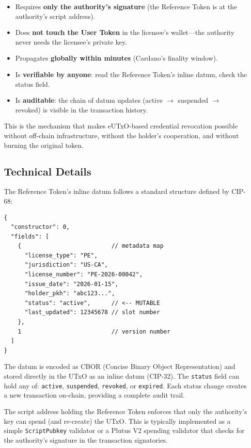 \begin{itemize}[nosep]
  \item Requires \textbf{only the authority's signature} (the Reference Token
    is at the authority's script address).
  \item Does \textbf{not touch the User Token} in the licensee's wallet---the
    authority never needs the licensee's private key.
  \item Propagates \textbf{globally within minutes} (Cardano's finality
    window).
  \item Is \textbf{verifiable by anyone}: read the Reference Token's inline
    datum, check the status field.
  \item Is \textbf{auditable}: the chain of datum updates (active $\to$
    suspended $\to$ revoked) is visible in the transaction history.
\end{itemize}

This is the mechanism that makes eUTxO-based credential revocation possible
without off-chain infrastructure, without the holder's cooperation, and
without burning the original token.

\subsection{Technical Details}

The Reference Token's inline datum follows a standard structure defined by
CIP-68:

\begin{lstlisting}[language={}, caption={CIP-68 datum structure (simplified)}]
{
  "constructor": 0,
  "fields": [
    {                          // metadata map
      "license_type": "PE",
      "jurisdiction": "US-CA",
      "license_number": "PE-2026-00042",
      "issue_date": "2026-01-15",
      "holder_pkh": "abc123...",
      "status": "active",      // <-- MUTABLE
      "last_updated": 12345678 // slot number
    },
    1                          // version number
  ]
}
\end{lstlisting}

The datum is encoded as CBOR (Concise Binary Object Representation) and
stored directly in the UTxO as an inline datum (CIP-32).  The \texttt{status}
field can hold any of: \texttt{active}, \texttt{suspended},
\texttt{revoked}, or \texttt{expired}.  Each status change creates a new
transaction on-chain, providing a complete audit trail.

The script address holding the Reference Token enforces that only the
authority's key can spend (and re-create) the UTxO.  This is typically
implemented as a simple \texttt{ScriptPubkey} validator or a Plutus V2
spending validator that checks for the authority's signature in the
transaction signatories.

